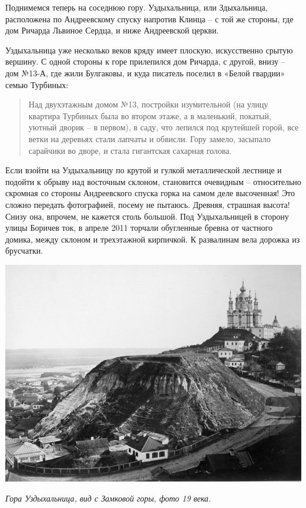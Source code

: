 Поднимемся теперь на соседнюю гору. Уздыхальница, или Здыхальница, расположена по Андреевскому спуску напротив Клинца – с той же стороны, где дом Ричарда Львиное Сердца, и ниже Андреевской церкви.

Уздыхальница уже несколько веков кряду имеет плоскую, искусственно срытую вершину. С одной стороны к горе прилепился дом Ричарда, с другой, внизу – дом №13-А, где жили Булгаковы, и куда писатель поселил в «Белой гвардии» семью Турбиных:

\begin{quotation}
Над двухэтажным домом №13, постройки изумительной (на улицу квартира Турбиных была во втором этаже, а в маленький, покатый, уютный дворик – в первом), в саду, что лепился под крутейшей горой, все ветки на деревьях стали лапчаты и обвисли. Гору замело, засыпало сарайчики во дворе, и стала гигантская сахарная голова. 
\end{quotation}

Если взойти на Уздыхальницу по крутой и гулкой металлической лестнице и подойти к обрыву над восточным склоном, становится очевидным – относительно скромная со стороны Андреевского спуска горка на самом деле высоченная! Это сложно передать фотографией, посему не пытаюсь. Древняя, страшная высота! Снизу она, впрочем, не кажется столь большой. Под Уздыхальницей в сторону улицы Боричев ток, в апреле 2011 торчали обугленные бревна от частного домика, между склоном и трехэтажной кирпичкой. К развалинам вела дорожка из брусчатки.

\begin{center}
\includegraphics[width=\linewidth]{chast-colebanie-osnov/gora-zamkovaya-valovaya/andreevskiy_spusk.jpg}

\textit{Гора Уздыхальница, вид с Замковой горы, фото 19 века.}
\end{center}

